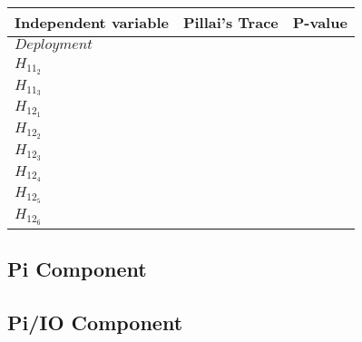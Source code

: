 \begin{table}[H]
\label{MANOVA}
\centering
\begin{tabular}{l|l|l}
\textbf{Independent variable} & \textbf{Pillai's Trace} & \textbf{P-value}	\\ \hline
$Deployment$ 		& 	\\
$H_{11_{2}}$ 		& 	\\
$H_{11_{3}}$ 		& 	\\          
$H_{12_{1}}$ 		& 	\\
$H_{12_{2}}$ 		& 	\\
$H_{12_{3}}$ 		& 	\\
$H_{12_{4}}$ 		& 	\\
$H_{12_{5}}$ 		& 	\\
$H_{12_{6}}$ 		& 
\end{tabular}
\end{table}




\subsection{Pi Component}
\subsection{Pi/IO Component}

